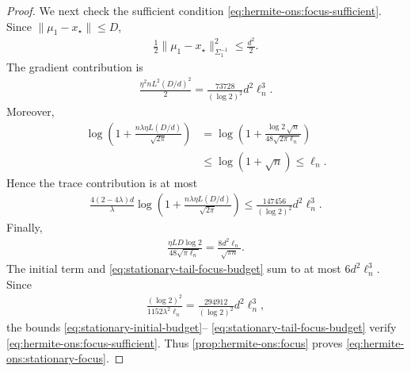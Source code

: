 \documentclass{article}
\theoremstyle{plain}
\theoremstyle{definition}
\theoremstyle{plain}
\begin{document}
\begin{proof}
    We next check the sufficient condition
    \eqref{eq:hermite-ons:focus-sufficient}. Since
    $\|\mu_1-x_\star\|\leq D$,
    \begin{align}
        \frac12
        \|\mu_1-x_\star\|_{\Sigma_1^{-1}}^2
        \leq
        \frac{d^2}{2}.
        \label{eq:stationary-initial-budget}
    \end{align}
    The gradient contribution is
    \begin{align}
        \frac{\eta^2nL^2(D/d)^2}{2}
        =
        \frac{73728}{(\log2)^2}
        d^2\ell_n^3.
        \label{eq:stationary-gradient-focus-budget}
    \end{align}
    Moreover,
    \begin{align}
        \log\left(
        1+
        \frac{n\lambda\eta L(D/d)}{\sqrt{2\pi}}
        \right)
         & =
        \log\left(
        1+
        \frac{\log2\,\sqrt n}
        {48\sqrt{2\pi\ell_n}}
        \right)
        \nonumber \\
         & \leq
        \log(1+\sqrt n)
        \leq
        \ell_n.
    \end{align}
    Hence the trace contribution is at most
    \begin{align}
        \frac{4(2-4\lambda)d}{\lambda}
        \log\left(
        1+
        \frac{n\lambda\eta L(D/d)}{\sqrt{2\pi}}
        \right)
        \leq
        \frac{147456}{(\log2)^2}
        d^2\ell_n^3.
        \label{eq:stationary-trace-focus-budget}
    \end{align}
    Finally,
    \begin{align}
        \frac{\eta LD\log2}
        {48\sqrt{\pi\ell_n}}
        =
        \frac{8d^2\ell_n}{\sqrt{\pi n}}.
        \label{eq:stationary-tail-focus-budget}
    \end{align}
    The initial term and
    \eqref{eq:stationary-tail-focus-budget} sum to at most
    $6d^2\ell_n^3$. Since
    \begin{align}
        \frac{(\log2)^2}
        {1152\lambda^2\ell_n}
        =
        \frac{294912}{(\log2)^2}
        d^2\ell_n^3,
    \end{align}
    the bounds
    \eqref{eq:stationary-initial-budget}--%
    \eqref{eq:stationary-tail-focus-budget} verify
    \eqref{eq:hermite-ons:focus-sufficient}. Thus
    \cref{prop:hermite-ons:focus} proves
    \eqref{eq:hermite-ons:stationary-focus}.


\end{proof}
\end{document}
